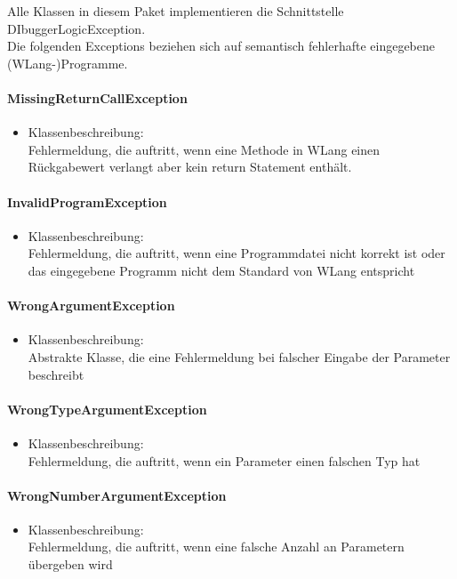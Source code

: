 \documentclass[parskip=full]{scrartcl}
\begin{document}
Alle Klassen in diesem Paket implementieren die Schnittstelle DIbuggerLogicException. \\
Die folgenden Exceptions beziehen sich auf semantisch fehlerhafte eingegebene (WLang-)Programme.
\paragraph{MissingReturnCallException}
\begin{itemize}
\item Klassenbeschreibung: \\
Fehlermeldung, die auftritt, wenn eine Methode in WLang einen Rückgabewert verlangt aber kein return Statement enthält.
\end{itemize}

\paragraph{InvalidProgramException}
\begin{itemize}
\item Klassenbeschreibung: \\
Fehlermeldung, die auftritt, wenn eine Programmdatei nicht korrekt ist oder das eingegebene Programm nicht dem Standard von WLang entspricht
\end{itemize}

\paragraph{WrongArgumentException}
\begin{itemize}
\item Klassenbeschreibung: \\
Abstrakte Klasse, die eine Fehlermeldung bei falscher Eingabe der Parameter beschreibt
\end{itemize}

\paragraph{WrongTypeArgumentException}
\begin{itemize}
\item Klassenbeschreibung: \\
Fehlermeldung, die auftritt, wenn ein Parameter einen falschen Typ hat
\end{itemize}

\paragraph{WrongNumberArgumentException}
\begin{itemize}
\item Klassenbeschreibung: \\
Fehlermeldung, die auftritt, wenn eine falsche Anzahl an Parametern übergeben wird
\end{itemize}
\end{document}
